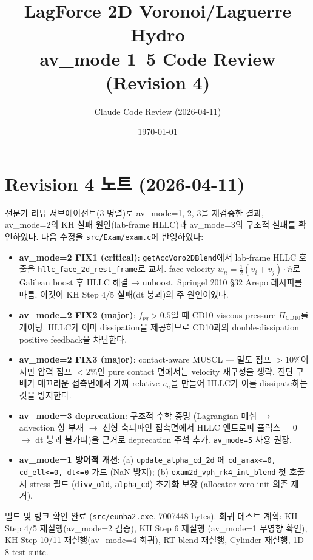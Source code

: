 \documentclass[11pt]{article}
\title{LagForce 2D Voronoi/Laguerre Hydro\\
  \large av\_mode 1--5 Code Review (Revision 4)}
\author{Claude Code Review (2026-04-11)}
\date{\today}
\begin{document}
\maketitle

\tableofcontents
\newpage

\section*{Revision 4 노트 (2026-04-11)}

전문가 리뷰 서브에이전트(3 병렬)로 av\_mode=1, 2, 3을 재검증한 결과,
av\_mode=2의 KH 실패 원인(lab-frame HLLC)과 av\_mode=3의 구조적 실패를
확인하였다. 다음 수정을 \texttt{src/Exam/exam.c}에 반영하였다:

\begin{itemize}
  \item \textbf{av\_mode=2 FIX1 (critical)}: \texttt{getAccVoro2DBlend}에서
    lab-frame HLLC 호출을 \texttt{hllc\_face\_2d\_rest\_frame}로 교체.
    face velocity $w_n = \tfrac12(v_i+v_j)\cdot\hat n$로 Galilean boost 후
    HLLC 해결 → unboost. Springel 2010 §32 Arepo 레시피를 따름. 이것이
    KH Step 4/5 실패(dt 붕괴)의 주 원인이었다.
  \item \textbf{av\_mode=2 FIX2 (major)}: $f_{pq} > 0.5$일 때 CD10 viscous
    pressure $\Pi_{\mathrm{CD10}}$를 게이팅. HLLC가 이미 dissipation을
    제공하므로 CD10과의 double-dissipation positive feedback을 차단한다.
  \item \textbf{av\_mode=2 FIX3 (major)}: contact-aware MUSCL — 밀도 점프
    $>10\%$이지만 압력 점프 $<2\%$인 pure contact 면에서는 velocity
    재구성을 생략. 전단 구배가 매끄러운 접촉면에서 가짜 relative $v_n$을
    만들어 HLLC가 이를 dissipate하는 것을 방지한다.
  \item \textbf{av\_mode=3 deprecation}: 구조적 수학 증명 (Lagrangian 메쉬
    $\to$ advection 항 부재 $\to$ 선형 축퇴파인 접촉면에서 HLLC 엔트로피
    플럭스 = 0 $\to$ dt 붕괴 불가피)을 근거로 deprecation 주석 추가.
    \texttt{av\_mode=5} 사용 권장.
  \item \textbf{av\_mode=1 방어적 개선}: (a) \texttt{update\_alpha\_cd\_2d}
    에 \texttt{cd\_amax<=0, cd\_ell<=0, dt<=0} 가드 (NaN 방지);
    (b) \texttt{exam2d\_vph\_rk4\_int\_blend} 첫 호출 시 stress 필드
    (\texttt{divv\_old}, \texttt{alpha\_cd}) 초기화 보장 (allocator
    zero-init 의존 제거).
\end{itemize}

빌드 및 링크 확인 완료 (\texttt{src/eunha2.exe}, 7007448 bytes).
회귀 테스트 계획: KH Step 4/5 재실행(av\_mode=2 검증), KH Step 6 재실행
(av\_mode=1 무영향 확인), KH Step 10/11 재실행(av\_mode=4 회귀),
RT blend 재실행, Cylinder 재실행, 1D 8-test suite.
\end{document}
